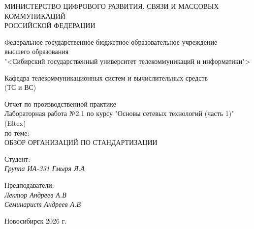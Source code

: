 \thispagestyle{empty}

\begin{center}
    МИНИСТЕРСТВО ЦИФРОВОГО РАЗВИТИЯ, СВЯЗИ И МАССОВЫХ КОММУНИКАЦИЙ \\ РОССИЙСКОЙ ФЕДЕРАЦИИ

    \vspace{20pt}

    Федеральное государственное бюджетное образовательное учреждение  \\  высшего образования \\
    "<Сибирский государственный университет телекоммуникаций и информатики"> \\

    \vspace{20pt}

    Кафедра телекоммуникационных систем и вычислительных средств \\  (ТС и ВС)
\end{center}

\vfill

\begin{center}
    Отчет по производственной практике \\  
    Лабораторная работа №2.1 по курсу "Основы сетевых технологий (часть 1)" (Eltex) \\
    \vspace{20pt}
    по теме: \\
    \uppercase{Обзор организаций по стандартизации}
\end{center}

\vfill

    \noindent Студент: \\
    \textit{Группа ИА-331 \hfill Гмыря Я.А}

    \vspace{20pt}

    \noindent Предподаватели: \\
    \textit{Лектор \hfill Андреев А.В} \\
    \textit{Семинарист \hfill Андреев А.В}

\vfill

\begin{center}
    Новосибирск 2026 г.
\end{center}